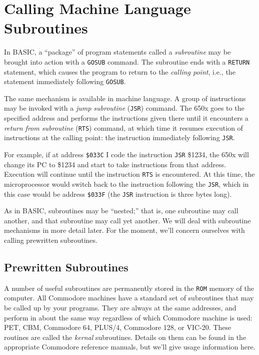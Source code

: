 \documentclass[11pt,a4paper,titlepage]{memoir}
\begin{document}
\section{Calling Machine Language Subroutines}
In BASIC, a ``package'' of program statements called a \emph{subroutine} may
be brought into action with a \texttt{GOSUB} command. The subroutine ends with
a \texttt{RETURN} statement, which causes the program to return to the \emph{calling
point}, i.e., the statement immediately following \texttt{GOSUB}.

The same mechanism is available in machine language. A group of instructions may be invoked with a \emph{jump subroutine} (\texttt{JSR}) command. The
650x goes to the specified address and performs the instructions given
there until it encounters a \emph{return from subroutine} (\texttt{RTS}) command, at
which time it resumes execution of instructions at the calling point: the
instruction immediately following \texttt{JSR}.

For example, if at address \texttt{\$033C} I code the instruction \texttt{JSR} \$1234,
the 650x will change its PC to \$1234 and start to take instructions from
that address. Execution will continue until the instruction \texttt{RTS} is encountered. 
At this time, the microprocessor would switch back to the instruction
following the \texttt{JSR}, which in this case would be address \texttt{\$033F} (the \texttt{JSR}
instruction is three bytes long).

As in BASIC, subroutines may be ``nested;'' that is, one subroutine may
call another, and that subroutine may call yet another. We will deal with
subroutine mechanisms in more detail later. For the moment, we'll concern
ourselves with calling prewritten subroutines.

\subsection{Prewritten Subroutines}
A number of useful subroutines are permanently stored in the \texttt{ROM} memory of the computer. All Commodore machines have a standard set of
subroutines that may be called up by your programs. They are always at the
same addresses, and perform in about the same way regardless of which
Commodore machine is used: PET, CBM, Commodore 64, PLUS/4, Commodore 128, or VIC-20. These routines are called the \emph{kernal} subroutines.
Details on them can be found in the appropriate Commodore reference
manuals, but we'll give usage information here.
\end{document}
